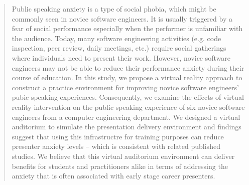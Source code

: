 \documentclass{llncs}
\begin{document}
\begin{abstract}


Public speaking anxiety is a type of social phobia, which might be commonly seen in novice software engineers. It is usually triggered by a fear of social performance especially when the performer is unfamiliar with the audience. Today, many software engineering activities (e.g. code inspection, peer review, daily meetings, etc.) require social gatherings where individuals need to present their work. However, novice software engineers may not be able to reduce their performance anxiety during their course of education. In this study, we propose a virtual reality approach to construct a practice environment for improving novice software engineers' pubic speaking experiences. Consequently, we examine the effects of virtual reality intervention on the public speaking experience of six novice software engineers from a computer engineering department. We designed a virtual auditorium to simulate the presentation delivery environment and findings suggest that using this infrastructre for training purposes can reduce presenter anxiety levels – which is consistent with related published studies. We believe that this virtual auditorium environment can deliver benefits for students and practitioners alike in terms of addressing the anxiety that is often associated with early stage career presenters.

\end{abstract}
\end{document}

